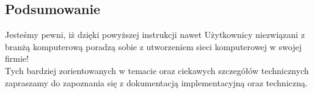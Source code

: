 \subsection{Podsumowanie}
Jesteśmy pewni, iż dzięki powyższej instrukcji nawet Użytkownicy niezwiązani z branżą komputerową poradzą sobie z utworzeniem sieci komputerowej w swojej firmie!\\
\indent Tych bardziej zorientowanych w temacie oraz ciekawych szczegółów technicznych zapraszamy do zapoznania się z dokumentacją implementacyjną oraz techniczną.
